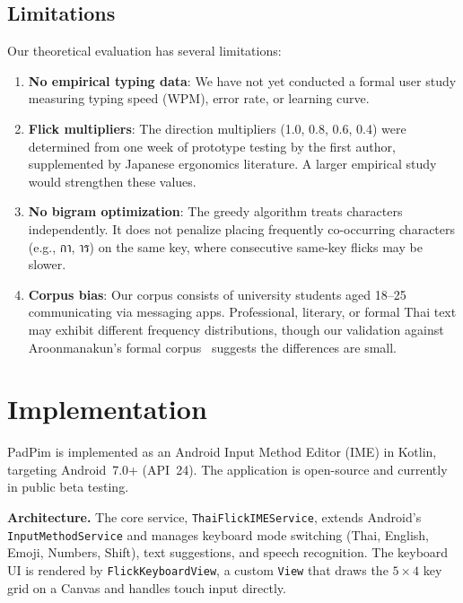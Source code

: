 \documentclass[10pt,twocolumn,a4paper]{article}
\newcommand{\thai}[1]{{\thaifont #1}}
\begin{document}
\subsection{Limitations}
\label{sec:eval_limits}

Our theoretical evaluation has several limitations:
\begin{enumerate}
  \item \textbf{No empirical typing data}: We have not yet conducted a formal user study measuring typing speed (WPM), error rate, or learning curve.
  \item \textbf{Flick multipliers}: The direction multipliers (1.0, 0.8, 0.6, 0.4) were determined from one week of prototype testing by the first author, supplemented by Japanese ergonomics literature. A larger empirical study would strengthen these values.
  \item \textbf{No bigram optimization}: The greedy algorithm treats characters independently. It does not penalize placing frequently co-occurring characters (e.g., \thai{กา}, \thai{าร}) on the same key, where consecutive same-key flicks may be slower.
  \item \textbf{Corpus bias}: Our corpus consists of university students aged 18--25 communicating via messaging apps. Professional, literary, or formal Thai text may exhibit different frequency distributions, though our validation against Aroonmanakun's formal corpus~\cite{aroonmanakun2006} suggests the differences are small.
\end{enumerate}

\section{Implementation}
\label{sec:impl}

PadPim is implemented as an Android Input Method Editor (IME) in Kotlin, targeting Android~7.0+ (API~24).
The application is open-source and currently in public beta testing.

\textbf{Architecture.}
The core service, \texttt{ThaiFlickIMEService}, extends Android's \texttt{InputMethodService} and manages keyboard mode switching (Thai, English, Emoji, Numbers, Shift), text suggestions, and speech recognition.
The keyboard UI is rendered by \texttt{FlickKeyboardView}, a custom \texttt{View} that draws the $5 \times 4$ key grid on a Canvas and handles touch input directly.
\end{document}
